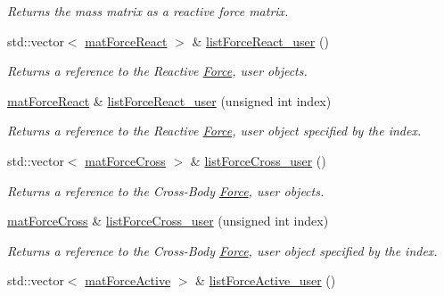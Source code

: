 \begin{DoxyCompactItemize}
\begin{DoxyCompactList}\small\item\em Returns the mass matrix as a reactive force matrix. \end{DoxyCompactList}\item 
std\-::vector$<$ \hyperlink{classosea_1_1ofreq_1_1mat_force_react}{mat\-Force\-React} $>$ \& \hyperlink{classosea_1_1ofreq_1_1mat_body_aeb296f7c56b523b32ca12b58de56ef37}{list\-Force\-React\-\_\-user} ()
\begin{DoxyCompactList}\small\item\em Returns a reference to the Reactive \hyperlink{classosea_1_1ofreq_1_1_force}{Force}, user objects. \end{DoxyCompactList}\item 
\hyperlink{classosea_1_1ofreq_1_1mat_force_react}{mat\-Force\-React} \& \hyperlink{classosea_1_1ofreq_1_1mat_body_a53cbb789ae423084375b024954bf21f0}{list\-Force\-React\-\_\-user} (unsigned int index)
\begin{DoxyCompactList}\small\item\em Returns a reference to the Reactive \hyperlink{classosea_1_1ofreq_1_1_force}{Force}, user object specified by the index. \end{DoxyCompactList}\item 
std\-::vector$<$ \hyperlink{classosea_1_1ofreq_1_1mat_force_cross}{mat\-Force\-Cross} $>$ \& \hyperlink{classosea_1_1ofreq_1_1mat_body_a5dc37a8bb5143f2034ef6491969b2abe}{list\-Force\-Cross\-\_\-user} ()
\begin{DoxyCompactList}\small\item\em Returns a reference to the Cross-\/\-Body \hyperlink{classosea_1_1ofreq_1_1_force}{Force}, user objects. \end{DoxyCompactList}\item 
\hyperlink{classosea_1_1ofreq_1_1mat_force_cross}{mat\-Force\-Cross} \& \hyperlink{classosea_1_1ofreq_1_1mat_body_ae508a1904283a46d1fc5893da4080630}{list\-Force\-Cross\-\_\-user} (unsigned int index)
\begin{DoxyCompactList}\small\item\em Returns a reference to the Cross-\/\-Body \hyperlink{classosea_1_1ofreq_1_1_force}{Force}, user object specified by the index. \end{DoxyCompactList}\item 
std\-::vector$<$ \hyperlink{classosea_1_1ofreq_1_1mat_force_active}{mat\-Force\-Active} $>$ \& \hyperlink{classosea_1_1ofreq_1_1mat_body_a6a51e55baec56037eee824ec53af9b5d}{list\-Force\-Active\-\_\-user} ()

\end{DoxyCompactItemize}

